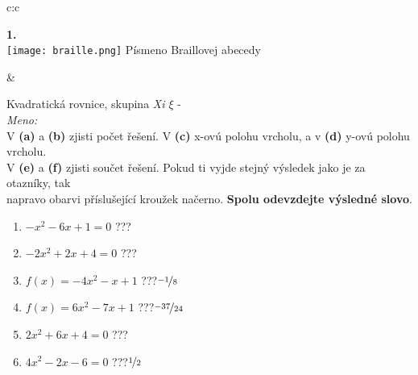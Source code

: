 \documentclass[10pt]{report}
\begin{document}
\begin{tabular}{c:c}
\begin{minipage}[c][99mm][t]{0.49\linewidth}
\begin{center}
\begin{minipage}{0.20\linewidth}
\begin{center}
{\Huge\bfseries 1.} \\[2mm]
\texttt{[image: braille.png]}
{\small Písmeno Braillovej abecedy}
\end{center}
\end{minipage}
\end{center}
\end{minipage}
&
\begin{minipage}[c][99mm][t]{0.49\linewidth}
\begin{center}
\vspace{7mm}
{\huge Kvadratická rovnice, skupina \textit{Xi $\xi$} -}\\[4.5mm]
\textit{Meno:}\phantom{xxxxxxxxxxxxxxxxxxxxxxxxxxxxxxxxxxxxxxxxxxxxxxxxxxxxxxxxxxxxxxxxx}\\[3.5mm]
V \textbf{(a)} a \textbf{(b)} zjisti počet řešení. V \textbf{(c)} x-ovú polohu vrcholu, a v \textbf{(d)} y-ovú polohu vrcholu.\\V \textbf{(e)} a \textbf{(f)} zjisti součet řešení. Pokud ti vyjde stejný výsledek jako je za otazníky, tak\\napravo obarvi příslušející kroužek načerno. \textbf{Spolu odevzdejte výsledné slovo}.\\[3mm]
\begin{minipage}{0.77\linewidth}
\begin{center}
\begin{varwidth}{\textwidth}
\begin{enumerate}
\large
\item $-x^2-6x+1=0$\quad \dotfill\; ???\;\dotfill {}
\item $-2x^2+2x+4=0$\quad \dotfill\; ???\;\dotfill {}
\item $f(x)=-4x^2-x+1$\quad \dotfill\; ???\;\dotfill \quad $\nicefrac{-1}{8}$
\item $f(x)=6x^2-7x+1$\quad \dotfill\; ???\;\dotfill \quad $\nicefrac{-37}{24}$
\item $2x^2+6x+4=0$\quad \dotfill\; ???\;\dotfill {}
\item $4x^2-2x-6=0$\quad \dotfill\; ???\;\dotfill \quad $\nicefrac{1}{2}$
\end{enumerate}
\end{varwidth}
\end{center}
\end{minipage}
\begin{minipage}{0.20\linewidth}
\begin{center}

\end{center}
\end{minipage}
\end{center}
\end{minipage}
\end{tabular}
\end{document}
